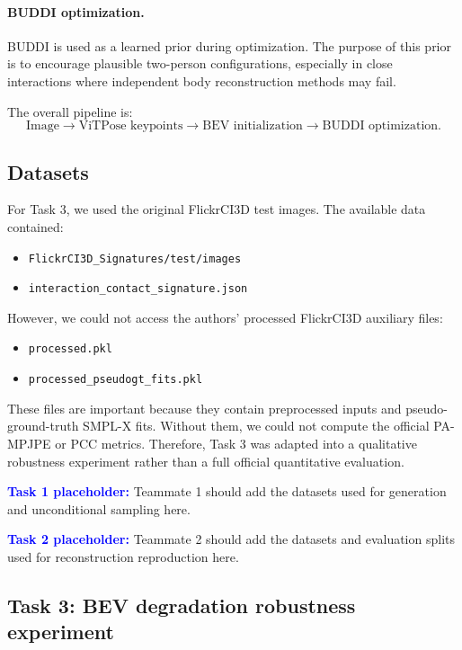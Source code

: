 \documentclass[10pt]{article}
\begin{document}
\paragraph{BUDDI optimization.}
BUDDI is used as a learned prior during optimization. The purpose of this prior is to encourage plausible two-person configurations, especially in close interactions where independent body reconstruction methods may fail.

The overall pipeline is:
\[
\text{Image} \rightarrow \text{ViTPose keypoints} \rightarrow \text{BEV initialization} \rightarrow \text{BUDDI optimization}.
\]

\subsection{Datasets}

For Task 3, we used the original FlickrCI3D test images. The available data contained:

\begin{itemize}
    \item \texttt{FlickrCI3D\_Signatures/test/images}
    \item \texttt{interaction\_contact\_signature.json}
\end{itemize}

However, we could not access the authors' processed FlickrCI3D auxiliary files:

\begin{itemize}
    \item \texttt{processed.pkl}
    \item \texttt{processed\_pseudogt\_fits.pkl}
\end{itemize}

These files are important because they contain preprocessed inputs and pseudo-ground-truth SMPL-X fits. Without them, we could not compute the official PA-MPJPE or PCC metrics. Therefore, Task 3 was adapted into a qualitative robustness experiment rather than a full official quantitative evaluation.

\textcolor{blue}{\textbf{Task 1 placeholder:}} Teammate 1 should add the datasets used for generation and unconditional sampling here.

\textcolor{blue}{\textbf{Task 2 placeholder:}} Teammate 2 should add the datasets and evaluation splits used for reconstruction reproduction here.

\subsection{Task 3: BEV degradation robustness experiment}
\end{document}
